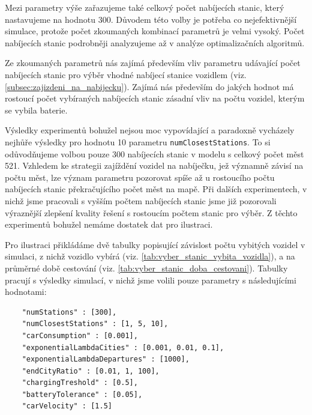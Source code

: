 Mezi parametry výše zařazujeme také celkový počet nabíjecích stanic, který nastavujeme
na hodnotu 300. Důvodem této volby je potřeba co nejefektivnější simulace, protože 
počet zkoumaných kombinací parametrů je velmi vysoký. Počet nabíjecích stanic podrobněji
analyzujeme až v analýze optimalizačních algoritmů.

Ze zkoumaných parametrů nás zajímá především vliv parametru udávající počet nabíjecích
stanic pro výběr vhodné nabíjecí stanice vozidlem 
(viz. \cref{subsec:zajizdeni_na_nabijecku}).
Zajímá nás především do jakých hodnot má rostoucí počet vybíraných nabíjecích stanic
zásadní vliv na počtu vozidel, kterým se vybila baterie. 

Výsledky experimentů bohužel nejsou moc vypovídající a paradoxně vycházely nejhůře
výsledky pro hodnotu 10 parametru \texttt{numClosestStations}.
To si odůvodňujeme volbou pouze 300 nabíjecích stanic v modelu
s celkový počet měst 521. Vzhledem ke strategii zajíždění vozidel na 
nabíječku, jež významně závisí na počtu měst, lze význam parametru pozorovat spíše až u 
rostoucího počtu nabíjecích stanic překračujícího počet měst na mapě. Při dalších experimentech, v
nichž jsme pracovali s vyšším počtem nabíjecích stanic jsme již pozorovali výraznější zlepšení
kvality řešení s rostoucím počtem stanic pro výběr. Z těchto experimentů bohužel
nemáme dostatek dat pro ilustraci.

Pro ilustraci přikládáme dvě tabulky popisující závislost počtu vybitých vozidel v simulaci, z nichž 
vozidlo vybírá (viz. \cref{tab:vyber_stanic_vybita_vozidla}), a na 
průměrné době cestování (viz. \cref{tab:vyber_stanic_doba_cestovani}). Tabulky
pracují s výsledky simulací, v nichž jsme volili pouze parametry s následujícími hodnotami:

\begin{Verbatim}
    "numStations" : [300],
    "numClosestStations" : [1, 5, 10], 
    "carConsumption" : [0.001],
    "exponentialLambdaCities" : [0.001, 0.01, 0.1],
    "exponentialLambdaDepartures" : [1000],
    "endCityRatio" : [0.01, 1, 100],
    "chargingTreshold" : [0.5],
    "batteryTolerance" : [0.05],
    "carVelocity" : [1.5]
\end{Verbatim}


